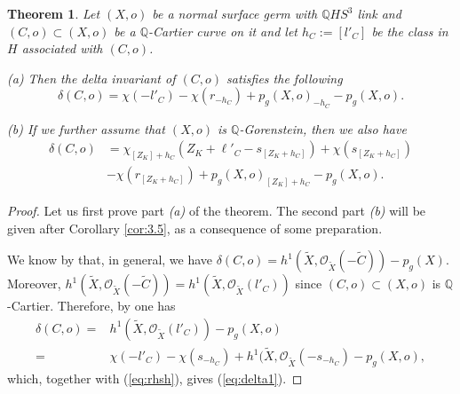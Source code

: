 \documentclass[12pt,a4paper]{amsart}
\def\cO{\mathcal{O}}
\newtheorem{thm}{Theorem}[section]  %
\theoremstyle{remark}
\theoremstyle{definition}
\begin{document}
\begin{thm}\label{thm:delta}
Let $(X,o)$ be a  normal surface germ with $\mathbb{Q}HS^3$ link and $(C,o)\subset (X,o)$ be a $\mathbb{Q}$-Cartier curve on it and let $h_C:=[l'_C]$ be the class in $H$ associated with $(C,o)$. 

(a) Then the delta invariant of $(C,o)$ satisfies the following 
\begin{equation}\label{eq:delta1}
\delta(C,o)=\chi(-l'_C)-\chi(r_{-h_C})+p_g(X,o)_{-h_C}-p_g(X,o).
\end{equation}

(b) If we further assume that $(X,o)$ is $\mathbb{Q}$-Gorenstein, then we also have 
\begin{equation}\label{eq:delta2}
\begin{split}
 \delta(C,o) &= 
\chi_{[Z_K]+h_C}(Z_K+\ell'_C-s_{[Z_K+h_C]})+\chi(s_{[Z_K+h_C]}) \\ &-\chi(r_{[Z_K+h_C]})+p_g(X,o)_{[Z_K]+h_C}-p_g(X,o).
\end{split}
\end{equation}
\end{thm}
\vspace{0.1cm}

\begin{proof} Let us first prove part {\it (a) } of the theorem. The second part {\it (b)}
will be given after Corollary \ref{cor:3.5}, as a consequence of some preparation.

We know by \cite[Thm 1.3.(2)]{delta1} that, in general, we have $\delta(C,o)=h^1({\tilde X}, \cO_{{\tilde X}}(-\widetilde{C}))-p_g(X)$. Moreover, $h^1({\tilde X}, \cO_{{\tilde X}}(-\widetilde{C}))=h^1({\tilde X}, \cO_{{\tilde X}}(l'_C))$ 
since $(C,o)\subset (X,o)$ is $\mathbb{Q}$-Cartier. Therefore, by \cite[Thm 1.3(1)]{delta1} one has 
\begin{equation}\begin{split}\label{eq:uj}
\delta(C,o)  = & h^1({\tilde X},\cO_{{\tilde X}}(l'_C))-p_g(X,o) \\  =&
\chi(-l'_C)-\chi(s_{-h_C})+h^1({\tilde X}, \cO_{{\tilde X}}(-s_{-h_C})-p_g(X,o),
\end{split}\end{equation}
which, together with (\ref{eq:rhsh}), gives (\ref{eq:delta1}).
\end{proof}
\end{document}
